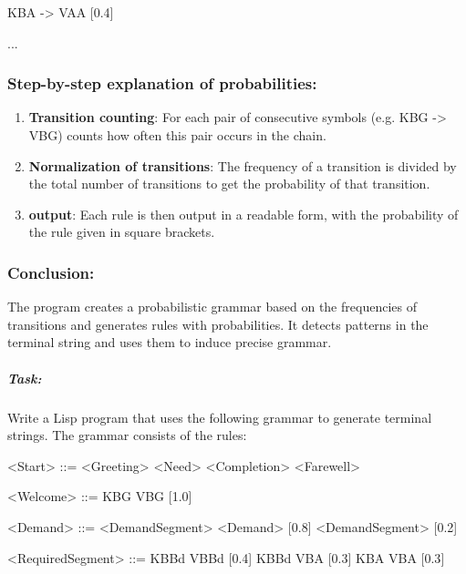 \documentclass[
]{article}
\begin{document}
KBA -\textgreater{} VAA {[}0.4{]}

...

\subsubsection{\texorpdfstring{\textbf{Step-by-step explanation of
probabilities:}}{Step-by-step explanation of probabilities:}}\label{step-by-step-explanation-of-probabilities}

\begin{enumerate}
\def\labelenumi{\arabic{enumi}.}
\item
  \textbf{Transition counting}: For each pair of consecutive symbols
  (e.g. KBG -\textgreater{} VBG) counts how often this pair occurs in
  the chain.
\item
  \textbf{Normalization of transitions}: The frequency of a transition
  is divided by the total number of transitions to get the probability
  of that transition.
\item
  \textbf{output}: Each rule is then output in a readable form, with the
  probability of the rule given in square brackets.
\end{enumerate}

\subsubsection{\texorpdfstring{\textbf{Conclusion:}}{Conclusion:}}\label{conclusion-1}

The program creates a probabilistic grammar based on the frequencies of
transitions and generates rules with probabilities. It detects patterns
in the terminal string and uses them to induce precise grammar.

\subparagraph{\texorpdfstring{\textbf{Task:}}{Task:}}\label{task-4}

Write a Lisp program that uses the following grammar to generate
terminal strings. The grammar consists of the rules:

\textless Start\textgreater{} ::= \textless Greeting\textgreater{}
\textless Need\textgreater{} \textless Completion\textgreater{}
\textless Farewell\textgreater{}

\textless Welcome\textgreater{} ::= KBG VBG {[}1.0{]}

\textless Demand\textgreater{} ::= \textless DemandSegment\textgreater{}
\textless Demand\textgreater{} {[}0.8{]} \textbar{}
\textless DemandSegment\textgreater{} {[}0.2{]}

\textless RequiredSegment\textgreater{} ::= KBBd VBBd {[}0.4{]}
\textbar{} KBBd VBA {[}0.3{]} \textbar{} KBA VBA {[}0.3{]}
\end{document}

